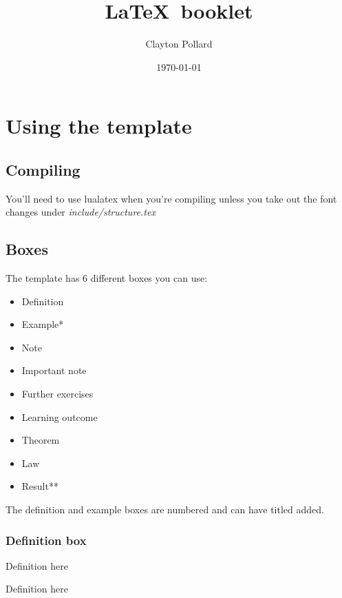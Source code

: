 \documentclass[11pt,a4paper,twoside]{report}
\title{\LaTeX\ booklet}
\author{Clayton Pollard}
\date{\today
}
\begin{document}
\ShowClozetrue

\tableofcontents

\chapter{Using the template}

\section{Compiling}

\begin{important}
You'll need to use lualatex when you're compiling unless you take out the font changes under \textit{include/structure.tex}
\end{important}

\section{Boxes}

The template has 6 different boxes you can use:
\begin{itemize}
  \item Definition
  \item Example*
  \item Note
  \item Important note
  \item Further exercises
  \item Learning outcome
  \item Theorem
  \item Law
  \item Result**
\end{itemize}
The definition and example boxes are numbered and can have titled added.

\subsection{Definition box}

\begin{definition}[Title]
  Definition here
\end{definition}

\begin{definition}
  Definition here
\end{definition}
\end{document}
